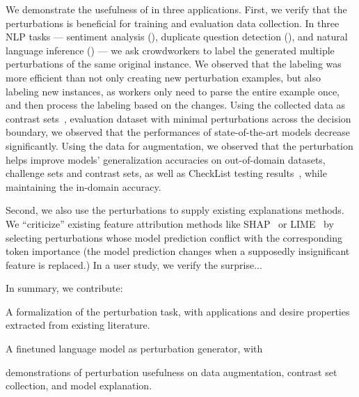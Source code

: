 We demonstrate the usefulness of \sysname in three applications. 
First, we verify that the perturbations is beneficial for training and evaluation data collection. 
In three NLP tasks --- sentiment analysis (\sst), duplicate question detection (\qqp), and natural language inference (\nli) --- we ask crowdworkers to label the generated multiple perturbations of the same original instance.
We observed that the labeling was more efficient than not only creating new perturbation examples, but also labeling new instances, as workers only need to parse the entire example once, and then process the labeling based on the changes.
Using the collected data as contrast sets~\cite{}, \ie evaluation dataset with minimal perturbations across the decision boundary, we observed that the performances of state-of-the-art models decrease significantly. 
Using the data for augmentation, we observed that the perturbation helps improve models' generalization accuracies on out-of-domain datasets, challenge sets and contrast sets, as well as CheckList testing results~\cite{checklist:acl20}, while maintaining the in-domain accuracy.

Second, we also use the perturbations to supply existing explanations methods.
We ``criticize'' existing feature attribution methods like SHAP~\cite{} or LIME~\cite{} by selecting perturbations whose model prediction conflict with the corresponding token importance (\eg the model prediction changes when a supposedly insignificant feature is replaced.)
In a user study, we verify the surprise...

In summary, we contribute: 
\begin{compactenum}
\item A formalization of the perturbation task, with applications and desire properties extracted from existing literature.
\item A finetuned language model as perturbation generator, with 
\item demonstrations of perturbation usefulness on data augmentation, contrast set collection, and model explanation. 
\end{compactenum}


   




